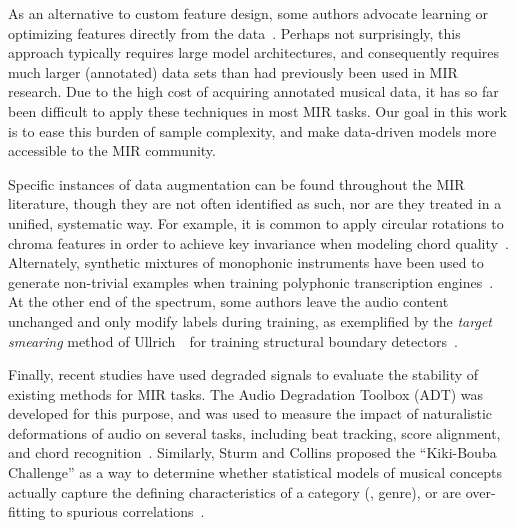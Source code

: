 \documentclass{article}
\begin{document}
%
%
%
As an alternative to custom feature design, some authors advocate learning or optimizing
features directly from the data~\cite{humphrey2012moving}.
Perhaps not surprisingly, this approach typically requires large model architectures, and
consequently requires much larger (annotated) data sets than had previously been
used in MIR research.
Due to the high cost of acquiring annotated musical data, it has so far been difficult to
apply these techniques in most MIR tasks.
Our goal in this work is to ease this burden of sample complexity, and make
data-driven models more accessible to the MIR community.

%
Specific instances of data augmentation can be found throughout the MIR literature,
though they are not often identified as such, nor are they treated in a unified,
systematic way.  For example, it is common to apply circular rotations to chroma features
in order to achieve key invariance when modeling chord quality~\cite{lee2008acoustic}.
Alternately, synthetic mixtures of monophonic instruments have been used
to generate non-trivial examples when training polyphonic transcription
engines~\cite{kirchhoff2012multi}.
At the other end of the spectrum, some authors leave the audio content unchanged and
only modify labels during training, as exemplified by the \emph{target smearing}
method of Ullrich~\etal\ for training structural boundary
detectors~\cite{ullrich2014boundary}.

%
%
Finally, recent studies have used degraded signals to evaluate the stability of
existing methods for MIR tasks.
The Audio Degradation Toolbox (ADT) was developed for this purpose, and was used
to measure the impact of naturalistic deformations of audio on several tasks, including
beat tracking, score alignment, and chord recognition~\cite{mauch2013audio}.
Similarly, Sturm and Collins proposed the ``Kiki-Bouba Challenge'' as a way to determine
whether statistical models of musical concepts actually capture the defining
characteristics of a category (\eg, genre), or are over-fitting to spurious
correlations~\cite{sturmkiki}.
\end{document}
